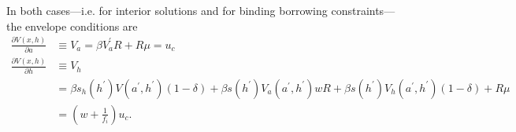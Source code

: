 \documentclass[a4paper,12pt]{article}%
\begin{document}
In both cases---i.e. for interior solutions and for binding borrowing
constraints---the envelope conditions are
\begin{align*}
\frac{\partial V\left(  x,h\right)  }{\partial a}  &  \equiv V_{a}=\beta
V_{a}^{\prime}R+R\mu=u_{c}\\
\frac{\partial V\left(  x,h\right)  }{\partial h}  &  \equiv V_{h}\\
&  =\beta s_{h}\left(  h^{\prime}\right)  V(a^{\prime},h^{\prime})\left(
1-\delta\right)  +\beta s\left(  h^{\prime}\right)  V_{a}(a^{\prime}%
,h^{\prime})wR+\beta s\left(  h^{\prime}\right)  V_{h}(a^{\prime},h^{\prime
})\left(  1-\delta\right)  +R\mu\\
&  =\left(  w+\frac{1}{f_{i}}\right)  u_{c}.
\end{align*}
\newpage


\end{document}
